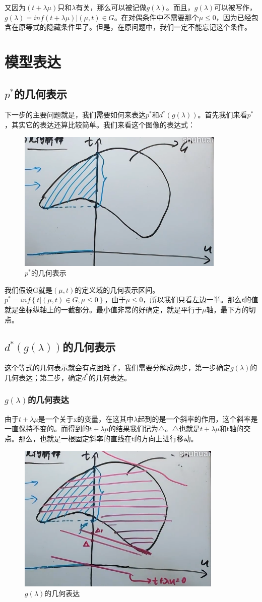 \documentclass[a4paper]{article}
\begin{document}
又因为$(t+\lambda \mu)$只和$\lambda$有关，那么可以被记做$g(\lambda)$。而且，$g(\lambda)$可以被写作，$g(\lambda) = inf (t+\lambda \mu)|(\mu,t)\in G$。在对偶条件中不需要那个$\mu \leq 0$，因为已经包含在原等式的隐藏条件里了。但是，在原问题中，我们一定不能忘记这个条件。

\section{模型表达}
\subsection{$p^\ast$的几何表示}
下一步的主要问题就是，我们需要如何来表达$p^\ast$和$d^\ast(g(\lambda))$。首先我们来看$p^\ast$，其实它的表达还算比较简单。我们来看这个图像的表达式：
\begin{figure}[H]
    \centering
    \includegraphics[width=.45\textwidth]{微信图片_20191117141212.png}
    \caption{$p^\ast$的几何表示}
    \label{fig:my_label_1}
\end{figure}

我们假设G就是$(\mu,t)$的定义域的几何表示区间。$p^\ast = inf\left\{ t|(\mu,t)\in G,\mu \leq 0 \right\}$，由于$\mu \leq 0$，所以我们只看左边一半。那么$t$的值就是坐标纵轴上的一截部分。最小值非常的好确定，就是平行于$\mu$轴，最下方的切点。

\subsection{$d^\ast(g(\lambda))$的几何表示}
这个等式的几何表示就会有点困难了，我们需要分解成两步，第一步确定$g(\lambda)$的几何表达；第二步，确定$d^\ast$的几何表达。

\subsubsection{$g(\lambda)$的几何表达}
由于$t+\lambda \mu$是一个关于x的变量，在这其中$\lambda$起到的是一个斜率的作用，这个斜率是一直保持不变的。而得到的$t+\lambda \mu$的结果我们记为$\triangle$。$\triangle$也就是$t+\lambda \mu$和t轴的交点。那么，也就是一根固定斜率的直线在t的方向上进行移动。
\begin{figure}[H]
    \centering
    \includegraphics[width=.4\textwidth]{微信图片_20191117143523.png}
    \caption{$g(\lambda)$的几何表达}
    \label{fig:my_label_1}
\end{figure}
\end{document}
